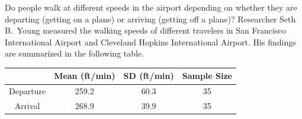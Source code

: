 \documentclass[noanswers]{exam}
\begin{document}
\begin{questions}
\begin{parts}
\begin{solution}[\stretch{1}]
\vspace{3mm}

\end{solution}

\end{parts}

\newpage

\question Do people walk at different speeds in the airport depending on whether they are departing (getting on a plane) or arriving (getting off a plane)? Researcher Seth B.\ Young measured the walking speeds of different travelers in San Francisco International Airport and Cleveland Hopkins International Airport. His findings are summarized in the following table.

\begin{center}
\begin{tabular}{c|c|c|c}
 & \textbf{Mean (ft/min)} & \textbf{SD (ft/min)} & \textbf{Sample Size}\\
\hline
Departure & 259.2 & 60.3 & 35 \\
\hline
Arrival & 268.9 & 39.9 & 35
\end{tabular}
\end{center}

\end{questions}
\end{document}
